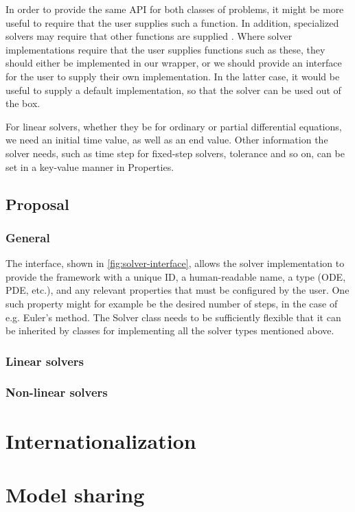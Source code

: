\documentclass[\rootfolder/main.tex]{subfiles}
\begin{document}
In order to provide the same API for both classes of problems, it might be more useful to require that the user supplies such a function.
In addition, specialized solvers may require that other functions are supplied \cite{kinsol}\cite{cvode}\cite{ida}.
Where solver implementations require that the user supplies functions such as these, they should either be implemented in our wrapper,
or we should provide an interface for the user to supply their own implementation.
In the latter case, it would be useful to supply a default implementation, so that the solver can be used out of the box.

For linear solvers, whether they be for ordinary or partial differential equations, we need an initial time value, as well as an end value.
Other information the solver needs, such as time step for fixed-step solvers, tolerance and so on, can be set in a key-value manner in Properties.

\subsection{Proposal}


\subsubsection{General}

The interface, shown in \cref{fig:solver-interface}, allows the solver implementation to provide the framework with a unique ID, a human-readable name, a
type (ODE, PDE, etc.\@), and any relevant properties that must be configured by the user.
One such property might for example be the desired number of steps, in the case of e.g. Euler's method.
The Solver class needs to be sufficiently flexible that it can be inherited by classes for implementing all the solver types mentioned above.

\subsubsection{Linear solvers}



\subsubsection{Non-linear solvers}

\section{Internationalization}

\section{Model sharing}
\end{document}
